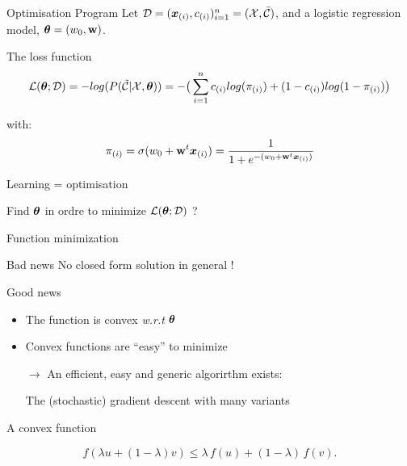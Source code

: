 \begin{frame}{Optimisation Program}
  Let $\mathcal{D} = (\boldsymbol{x}_{(i)},{c}_{(i)})_{i=1}^n = (\mathcal{X},\tilde{\mathcal{C}})$, and a  logistic regression model, $\boldsymbol{\theta} =  (w_0, \mathbf{w})$. \\
  \begin{block}{The loss function}
  $$
  \mathcal{L}(\boldsymbol{\theta};\mathcal{D}) = - log(P(\tilde{\mathcal{C}} | \mathcal{X}, \boldsymbol{\theta}) ) = -
  \big(\sum_{i=1}^n {c}_{(i)} log(\pi_{(i)} )+ (1-{c}_{(i)}) log(1-\pi_{(i)} )
  \big)
  $$
  
  with:
  $$       \pi_{(i)} = \sigma(w_0 + \mathbf{w}^t\boldsymbol{x}_{(i)})  = \frac{1}{1+e^{-(w_0 + \mathbf{w}^t\boldsymbol{x}_{(i)})}}$$
\end{block}



\begin{block}{Learning = optimisation}
  \begin{center}
    Find $\boldsymbol{\theta}$ in ordre to minimize $\mathcal{L}(\boldsymbol{\theta};\mathcal{D})$ ?
  \end{center}
\end{block}
\end{frame}


\begin{frame}{Function minimization}
  \begin{block}{Bad news}
    No closed form solution in general ! 
  \end{block}
  \begin{block}{Good news}
    \begin{itemize}
    \item The function is convex \textit{w.r.t} $\boldsymbol{\theta}$
    \item Convex functions are ``easy'' to minimize
    \item[$\rightarrow$] An efficient, easy and generic algorirthm exists: 
      \begin{center}
        The (stochastic)  gradient descent with many variants  
      \end{center}
    \end{itemize}
  \end{block}
\end{frame}


\begin{frame}{A convex function}
  \begin{center}
    
  \end{center}
$$  f\left(\lambda u +(1-\lambda)v\right)\leq \lambda\,f(u)+(1-\lambda)\,f(v).$$
\end{frame}


